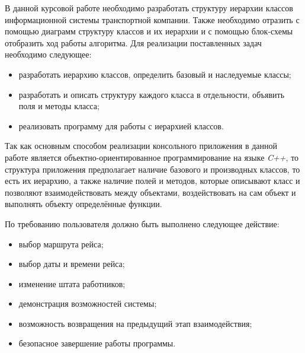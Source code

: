 В данной курсовой работе необходимо разработать структуру иерархии классов информационной системы транспортной компании. Также необходимо отразить с помощью диаграмм структуру классов и их иерархии и с помощью блок-схемы отобразить ход работы алгоритма.
Для реализации поставленных задач необходимо следующее:
\begin{itemize}
  \item разработать иерархию классов, определить базовый и наследуемые классы;
  \item разработать и описать структуру каждого класса в отдельности, объявить поля и методы класса;
  \item реализовать программу для работы с иерархией классов.
\end{itemize}
Так как основным способом реализации консольного приложения в данной работе является объектно-ориентированное программирование на языке \textit{C++}, то структура приложения предполагает наличие базового и производных классов, то есть их иерархию, а также наличие полей и методов, которые описывают класс и позволяют взаимодействовать между объектами, воздействовать на сам объект и выполнять объекту определённые функции.

По требованию пользователя должно быть выполнено следующее действие:

\begin{itemize}
\item выбор маршрута рейса;
\item выбор даты и времени рейса;
\item изменение штата работников;
\item демонстрация возможностей системы;
\item возможность возвращения на предыдущий этап взаимодействия;
\item безопасное завершение работы программы.
\end{itemize}
